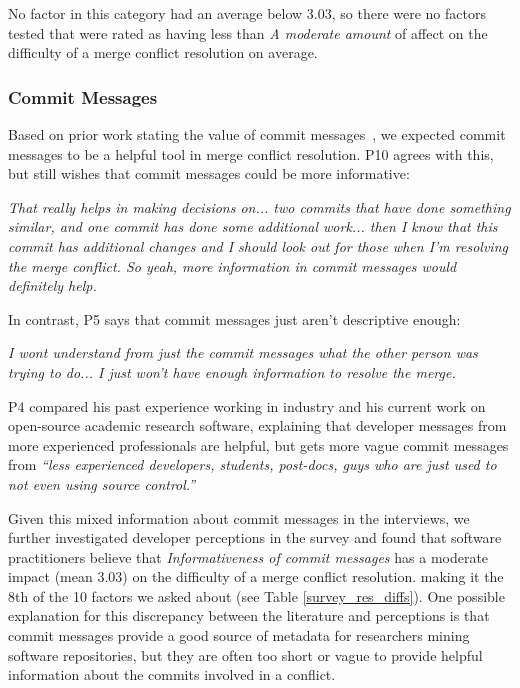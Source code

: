 No factor in this category had an average below 3.03, so there were no factors tested that were rated as having less than \textit{A moderate amount} of affect on the difficulty of a merge conflict resolution on average.

\subsubsection{Commit Messages}
Based on prior work stating the value of commit messages~\cite{yamauchi2014clustering}\cite{hindle2009automatic}\cite{cortes2014automatically}\cite{hattori2008nature}, we expected commit messages to be a helpful tool in merge conflict resolution. 
P10 agrees with this, but still wishes that commit messages could be more informative:
\begin{displayquote}
	\textit{That really helps in making decisions on... two commits that have done something similar, and one commit has done some additional work... then I know that this commit has additional changes and I should look out for those when I'm resolving the merge conflict. So yeah, more information in commit messages would definitely help.}
\end{displayquote}

In contrast, P5 says that commit messages just aren't descriptive enough:
\begin{displayquote}
\textit{I wont understand from just the commit messages what the other person was trying to do... I just won't have enough information to resolve the merge.}
\end{displayquote}

P4 compared his past experience working in industry and his current work on open-source academic research software, explaining that developer messages from more experienced professionals are helpful, but gets more vague commit messages from \textit{``less experienced developers, students, post-docs, guys who are just used to not even using source control.''}

Given this mixed information about commit messages in the interviews, we further investigated developer perceptions in the survey and found that software practitioners believe that \textit{Informativeness of commit messages} has a moderate impact (mean 3.03) on the difficulty of a merge conflict resolution. making it the 8th  of the 10 factors we asked about (see Table \ref{survey_res_diffs}). One possible explanation for this discrepancy between the literature and perceptions is that commit messages provide a good source of metadata for researchers mining software repositories, but they are often too short or vague to provide helpful information about the commits involved in a conflict.
